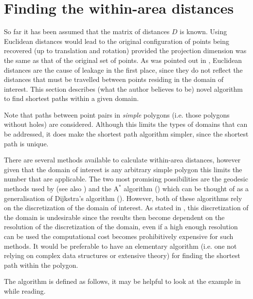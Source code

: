 \section{Finding the within-area distances}
\label{mdsdist}

So far it has been assumed that the matrix of distances $D$ is known. Using Euclidean distances would lead to the original configuration of points being recovered (up to translation and rotation) provided the projection dimension was the same as that of the original set of points. As was pointed out in , Euclidean distances are the cause of leakage in the first place, since they do not reflect the distances that must be travelled between points residing in the domain of interest. This section describes (what the author believes to be) novel algorithm to find shortest paths within a given domain.

Note that paths between point pairs in \textit{simple} polygons (i.e. those polygons without holes) are considered. Although this limits the types of domains that can be addressed, it does make the shortest path algorithm simpler, since the shortest path is unique.

There are several methods available to calculate within-area distances, however given that the domain of interest is any arbitrary simple polygon this limits the number that are applicable. The two most promising possibilities are the geodesic methods used by  (see also ) and the $\text{A}^*$ algorithm (\cite{astarpaper}) which can be thought of as a generalisation of Dijkstra's algorithm (\cite{dijkstra}). However, both of these algorithms rely on the discretization of the domain of interest. As stated in , this discretization of the domain is undesirable since the results then become dependent on the resolution of the discretization of the domain, even if a high enough resolution can be used the computational cost becomes prohibitively expensive for such methods. It would be preferable to have an elementary algorithm (i.e. one not relying on complex data structures or extensive theory) for finding the shortest path within the polygon.

The algorithm is defined as follows, it may be helpful to look at the example in  while reading.

